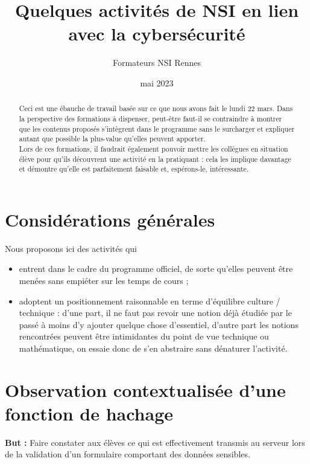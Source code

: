 \documentclass[12pt]{scrartcl}
\title{Quelques activités de NSI en lien avec la cybersécurité}
\author{\textsf{Formateurs NSI Rennes}}
\date{\textsf{mai 2023}}
\begin{document}
\maketitle

\begin{abstract}
    Ceci est une ébauche de travail basée sur ce que nous avons fait le lundi 22 mars.
    Dans la perspective des formations à dispenser, peut-être faut-il se contraindre à montrer que les contenus proposés s'intègrent dans le programme sans le surcharger et expliquer autant que possible la plus-value qu'elles peuvent apporter.\\
    Lors de ces formations, il faudrait également pouvoir mettre les collègues en situation élève pour qu'ils découvrent une activité en la pratiquant : cela les implique davantage et démontre qu'elle est parfaitement faisable et, espérons-le, intéressante.
\end{abstract}

\section{Considérations générales}


Nous proposons ici des activités qui
\begin{itemize}
    \item entrent dans le cadre du programme officiel, de sorte qu'elles peuvent être menées sans empiéter sur les temps de cours ;
    \item adoptent un positionnement raisonnable en terme d'équilibre culture / technique : d'une part, il ne faut pas revoir une notion déjà étudiée par le passé à moins d'y ajouter quelque chose d'essentiel, d'autre part les notions rencontrées peuvent être intimidantes du point de vue technique ou mathématique, on essaie donc de s'en abstraire sans dénaturer l'activité.
\end{itemize}

\section{Observation contextualisée d'une fonction de hachage}

\textbf{But : } Faire constater aux élèves ce qui est effectivement transmis au serveur lors de la validation d'un formulaire comportant des données sensibles.
\end{document}
